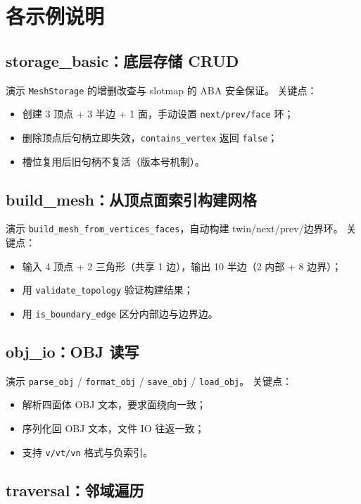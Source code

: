 \documentclass[11pt,a4paper]{article}
\begin{document}
\section{各示例说明}

\subsection{storage\_basic：底层存储 CRUD}

演示 \texttt{MeshStorage} 的增删改查与 slotmap 的 ABA 安全保证。
关键点：
\begin{itemize}
  \item 创建 3 顶点 + 3 半边 + 1 面，手动设置 \texttt{next/prev/face} 环；
  \item 删除顶点后句柄立即失效，\texttt{contains\_vertex} 返回 \texttt{false}；
  \item 槽位复用后旧句柄不复活（版本号机制）。
\end{itemize}

\subsection{build\_mesh：从顶点面索引构建网格}

演示 \texttt{build\_mesh\_from\_vertices\_faces}，自动构建 twin/next/prev/边界环。
关键点：
\begin{itemize}
  \item 输入 4 顶点 + 2 三角形（共享 1 边），输出 10 半边（2 内部 + 8 边界）；
  \item 用 \texttt{validate\_topology} 验证构建结果；
  \item 用 \texttt{is\_boundary\_edge} 区分内部边与边界边。
\end{itemize}

\subsection{obj\_io：OBJ 读写}

演示 \texttt{parse\_obj} / \texttt{format\_obj} / \texttt{save\_obj} / \texttt{load\_obj}。
关键点：
\begin{itemize}
  \item 解析四面体 OBJ 文本，要求面绕向一致；
  \item 序列化回 OBJ 文本，文件 IO 往返一致；
  \item 支持 \texttt{v/vt/vn} 格式与负索引。
\end{itemize}

\subsection{traversal：邻域遍历}
\end{document}
